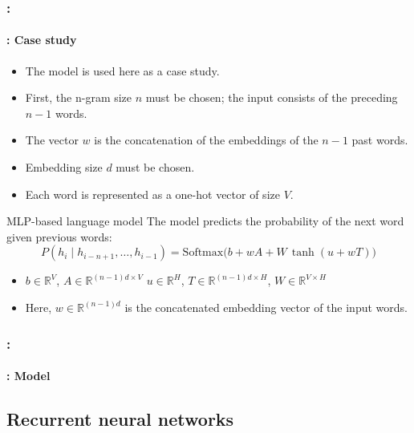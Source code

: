 \documentclass[xcolor=table]{beamer}
\begin{document}
\begin{frame}
	\frametitle{\insertshortsubtitle: \insertsection}
	\framesubtitle{\insertsubsection: Case study}
	
	\begin{itemize}
		\item The \cite{2003-bengio-al} model is used here as a case study.
		\item First, the n-gram size $n$ must be chosen; the input consists of the preceding $n-1$ words.
		\item The vector $w$ is the concatenation of the embeddings of the $n-1$ past words.
		\item Embedding size $d$ must be chosen.
		\item Each word is represented as a one-hot vector of size $V$.
	\end{itemize}
	
	\begin{block}{MLP-based language model}
		The model predicts the probability of the next word given previous words:
		\[
		P(h_i \mid h_{i-n+1}, \ldots, h_{i-1}) =
		\text{Softmax} \Big(
		b + w A + W \, \tanh(u + w T)
		\Big)
		\]
		
		\begin{itemize}
			\item $b \in \mathbb{R}^V$, $A \in \mathbb{R}^{(n-1)d \times V}$
			$u \in \mathbb{R}^H$, $T \in \mathbb{R}^{(n-1)d \times H}$, $W \in \mathbb{R}^{V \times H}$
			\item Here, $w \in \mathbb{R}^{(n-1)d}$ is the concatenated embedding vector of the input words.
		\end{itemize}
		
	\end{block}
	
\end{frame}


\begin{frame}
	\frametitle{\insertshortsubtitle: \insertsection}
	\framesubtitle{\insertsubsection: Model}
	

\end{frame}

\subsection{Recurrent neural networks}
\end{document}
